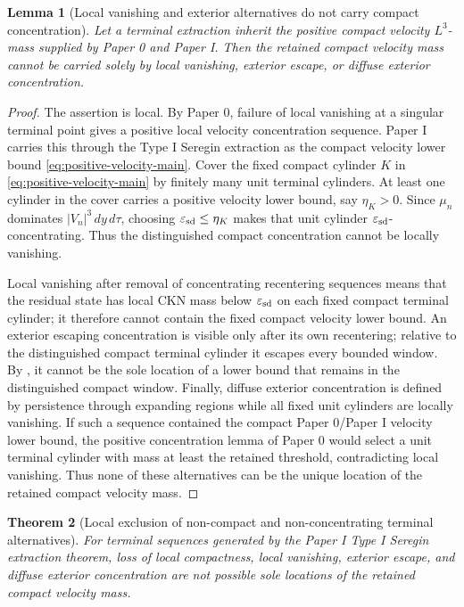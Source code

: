 \documentclass[11pt]{amsart}
\numberwithin{equation}{section}
\theoremstyle{plain}
\newtheorem{theorem}{Theorem}[section]
\newtheorem{lemma}[theorem]{Lemma}
\theoremstyle{definition}
\theoremstyle{remark}
\newcommand{\eps}{\varepsilon}
\begin{document}
\begin{lemma}[Local vanishing and exterior alternatives do not carry compact concentration]
\label{lem:radiative-stratum-discharge}
Let a terminal extraction inherit the positive compact velocity \(L^3\)-mass
supplied by Paper 0 and Paper I.  Then the retained compact velocity mass
cannot be carried solely by local vanishing, exterior escape, or diffuse
exterior concentration.
\end{lemma}

\begin{proof}
The assertion is local.  By Paper 0, failure of local vanishing at a singular
terminal point gives a positive local velocity concentration sequence.  Paper I
carries this through the Type I Seregin extraction as the compact velocity lower
bound \eqref{eq:positive-velocity-main}.  Cover the fixed compact cylinder
\(K\) in \eqref{eq:positive-velocity-main} by finitely many unit terminal
cylinders.  At least one cylinder in the cover carries a positive velocity
lower bound, say \(\eta_K>0\).  Since \(\mu_n\) dominates
\(|V_n|^3\,dy\,d\tau\), choosing \(\eps_{\rm sd}\le\eta_K\) makes that unit
cylinder \(\eps_{\rm sd}\)-concentrating.  Thus the distinguished compact
concentration cannot be locally vanishing.

Local vanishing after removal of concentrating recentering sequences means
that the residual state has local CKN mass below \(\eps_{\rm sd}\) on each fixed
compact terminal cylinder; it therefore cannot contain the fixed compact
velocity lower bound.  An exterior escaping concentration is visible only after
its own recentering; relative to the distinguished compact terminal cylinder it
escapes every bounded window.  By
, it cannot be the sole location of a
lower bound that remains in the distinguished compact window.  Finally, diffuse
exterior concentration is defined by persistence through expanding regions
while all fixed unit cylinders are locally vanishing.  If such a sequence
contained the compact Paper 0/Paper I velocity lower bound, the positive
concentration lemma of Paper 0 would select a unit terminal cylinder with mass
at least the retained threshold, contradicting local vanishing.  Thus none of
these alternatives can be the unique location of the retained compact velocity
mass.
\end{proof}

\begin{theorem}[Local exclusion of non-compact and non-concentrating terminal alternatives]
\label{thm:terminal-nonactive-discharge}
For terminal sequences generated by the Paper I Type I Seregin extraction
theorem, loss of local compactness, local vanishing, exterior escape, and
diffuse exterior concentration are not possible sole locations of the retained
compact velocity mass.
\end{theorem}
\end{document}
